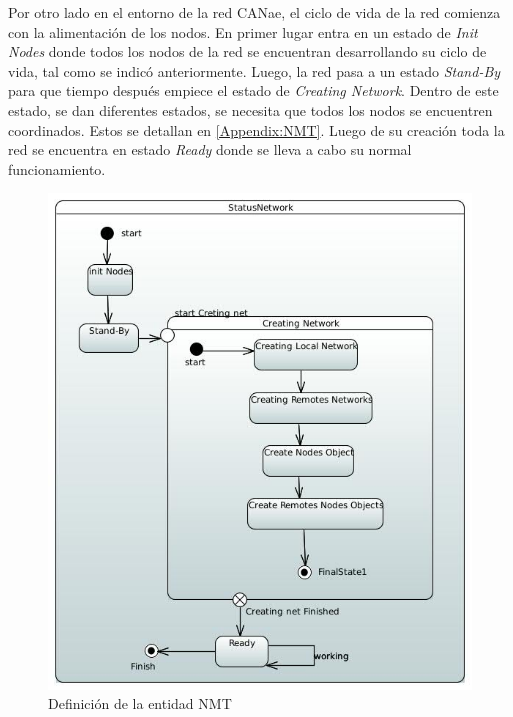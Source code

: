 Por otro lado en el entorno de la red CANae, el ciclo de vida de la red comienza
con la alimentación de los nodos. En primer lugar entra en un estado de
\textit{Init Nodes} donde todos los nodos de la red se encuentran desarrollando
su ciclo de vida, tal como se indicó anteriormente. Luego, la red pasa a un
estado \textit{Stand-By} para que tiempo después empiece el estado de \textit{Creating
  Network}. Dentro de este estado, se dan diferentes estados, se necesita que
todos los nodos se encuentren coordinados. Estos se detallan en
\ref{Appendix:NMT}. Luego de su creación toda la red se encuentra en estado
\textit{Ready} donde se lleva a cabo su normal funcionamiento.

\begin{figure}[h!]
 \centering
 \includegraphics[scale=0.4]{images/Secciones/AppendixA/StatusNetwork.JPG}
  \caption{Definición de la entidad NMT}
\label{fig:NodeStatus}
\end{figure}

